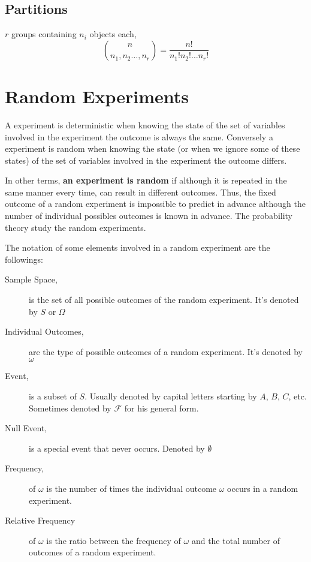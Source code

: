 \subsection{Partitions} %
\label{sub:partitions}

$r$ groups containing $n_i$ objects each,
\begin{equation*}
\binom{n}{n_1,n_2\dots,n_r} = \dfrac{n!}{n_1!n_2!\dots n_r!}
\end{equation*}

\section{Random Experiments} %
\label{sec:random_experiments}

 A experiment is deterministic when knowing the state of the set of variables
 involved in the experiment the outcome is always the same. Conversely a
 experiment is random when knowing the state (or when we ignore some of these
 states) of the set of variables involved in the experiment the outcome differs.
 
 In other terms, \textbf{an experiment is random} if although it is repeated in
 the same manner every time, can result in different outcomes. Thus, the fixed
 outcome of a random experiment is impossible to predict in advance although the
 number of individual possibles outcomes is known in advance. The probability
 theory study the random experiments.

 The notation of some elements involved in a random experiment are the
 followings:
 \begin{description}
     \item[Sample Space,] is the set of all possible outcomes of the
     random experiment. It's denoted by $S$ or $\Omega$
     \item[Individual Outcomes,] are the type of possible outcomes of a
     random experiment. It's denoted by $\omega$
     \item[Event,] is a subset of $S$. Usually denoted by capital
        letters starting by $A$, $B$, $C$, etc. Sometimes denoted by
        $\mathcal{F}$ for his general form. 
     \item[Null Event,] is a special event that never occurs. Denoted by
     $\emptyset$
     \item[Frequency,] of $\omega$ is the number of times the individual
     outcome $\omega$ occurs in a random experiment.
     \item[Relative Frequency] of $\omega$ is the ratio between the
     frequency of $\omega$ and the total number of outcomes of a random
     experiment.
 \end{description}

